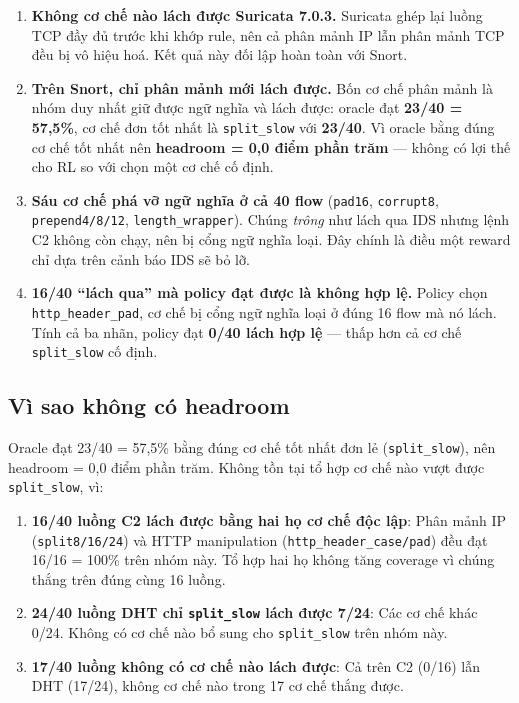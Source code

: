 \documentclass[12pt, a4paper, openany]{book}
\begin{document}
\begin{enumerate}
    \item \textbf{Không cơ chế nào lách được Suricata 7.0.3.} Suricata ghép lại
    luồng TCP đầy đủ trước khi khớp rule, nên cả phân mảnh IP lẫn phân mảnh TCP đều
    bị vô hiệu hoá. Kết quả này đối lập hoàn toàn với Snort.
    \item \textbf{Trên Snort, chỉ phân mảnh mới lách được.} Bốn cơ chế phân mảnh là
    nhóm duy nhất giữ được ngữ nghĩa và lách được: oracle đạt
    \textbf{23/40 = 57,5\%}, cơ chế đơn tốt nhất là \texttt{split\_slow} với
    \textbf{23/40}. Vì oracle bằng đúng cơ chế tốt nhất nên
    \textbf{headroom = 0,0 điểm phần trăm} --- không có lợi thế cho RL so với chọn
    một cơ chế cố định.
    \item \textbf{Sáu cơ chế phá vỡ ngữ nghĩa ở cả 40 flow}
    (\texttt{pad16}, \texttt{corrupt8}, \texttt{prepend4/8/12},
    \texttt{length\_wrapper}). Chúng \emph{trông} như lách qua IDS nhưng lệnh C2
    không còn chạy, nên bị cổng ngữ nghĩa loại. Đây chính là điều một reward chỉ dựa
    trên cảnh báo IDS sẽ bỏ lỡ.
    \item \textbf{16/40 ``lách qua'' mà policy đạt được là không hợp lệ.} Policy chọn
    \texttt{http\_header\_pad}, cơ chế bị cổng ngữ nghĩa loại ở đúng 16 flow mà nó
    lách. Tính cả ba nhãn, policy đạt \textbf{0/40 lách hợp lệ} --- thấp hơn cả
    cơ chế \texttt{split\_slow} cố định.
\end{enumerate}

\subsection*{Vì sao không có headroom}

Oracle đạt 23/40 = 57,5\% bằng đúng cơ chế tốt nhất đơn lẻ (\texttt{split\_slow}), nên headroom = 0,0 điểm phần trăm. Không tồn tại tổ hợp cơ chế nào vượt được \texttt{split\_slow}, vì:

\begin{enumerate}
    \item \textbf{16/40 luồng C2 lách được bằng hai họ cơ chế độc lập}: Phân mảnh IP (\texttt{split8/16/24}) và HTTP manipulation (\texttt{http\_header\_case/pad}) đều đạt 16/16 = 100\% trên nhóm này. Tổ hợp hai họ không tăng coverage vì chúng thắng trên đúng cùng 16 luồng.
    \item \textbf{24/40 luồng DHT chỉ \texttt{split\_slow} lách được 7/24}: Các cơ chế khác 0/24. Không có cơ chế nào bổ sung cho \texttt{split\_slow} trên nhóm này.
    \item \textbf{17/40 luồng không có cơ chế nào lách được}: Cả trên C2 (0/16) lẫn DHT (17/24), không cơ chế nào trong 17 cơ chế thắng được.
\end{enumerate}
\end{document}
